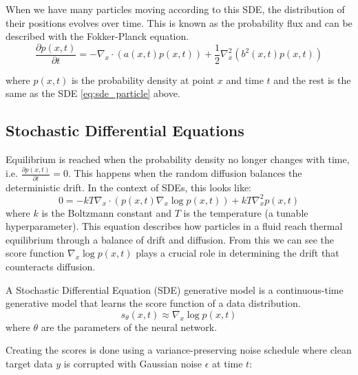 \documentclass[conference,a4paper]{IEEEtran}
\begin{document}
When we have many particles moving according to this SDE, the distribution of their positions evolves over time. This is known as the probability flux and can be described with the Fokker-Planck equation.
\begin{equation}
    \label{eq:fokker-planck}
    \frac{\partial p(x, t)}{\partial t} = -\nabla_x \cdot (a(x, t)p(x, t)) + \frac{1}{2}\nabla^2_x(b^2(x, t)p(x, t))
\end{equation}

where $p(x, t)$ is the probability density at point $x$ and time $t$ and the rest is the same as the SDE \ref{eq:sde_particle} above.

\subsection{Stochastic Differential Equations}

Equilibrium is reached when the probability density no longer changes with time, i.e. $\frac{\partial p(x, t)}{\partial t} = 0$. This happens when the random diffusion balances the deterministic drift. In the context of SDEs, this looks like:
\begin{equation}
    \label{eq:equilibrium}
    0 = -kT \nabla_x \cdot (p(x, t) \nabla_x \log p(x,t)) + kT \nabla_x^2 p(x, t)
\end{equation}
where $k$ is the Boltzmann constant and $T$ is the temperature (a tunable hyperparameter). This equation describes how particles in a fluid reach thermal equilibrium through a balance of drift and diffusion. From this we can see the score function $\nabla_x \log p(x,t)$ plays a crucial role in determining the drift that counteracts diffusion.

A Stochastic Differential Equation (SDE) generative model \cite{songScoreBasedGenerativeModeling2021} is a continuous-time generative model that learns the score function of a data distribution. 
\begin{equation}
s_\theta(x, t) \approx \nabla_x \log p(x,t)
\end{equation}
where $\theta$ are the parameters of the neural network.

Creating the scores is done using a variance-preserving noise schedule where clean target data $y$ is corrupted with Gaussian noise $\epsilon$ at time $t$:
\end{document}
